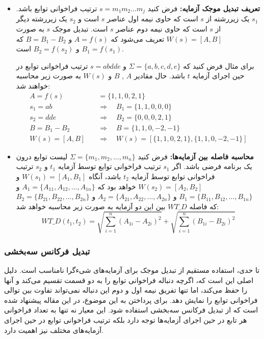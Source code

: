 \begin{itemize}
	\item \textbf{تعریف تبدیل موجک آزمایه:}
فرض کنید \(s = m_1 m_2 \dots m_j\) ترتیب فراخوانی توابع باشد. \(s_1\) یک زیررشته از \(s\) است که حاوی نیمه اول عناصر \(s\) است و \(s_2\) یک زیررشته دیگر از \(s\) است که حاوی نیمه دوم عناصر \(s\) است. تبدیل موجک \(s\) به صورت \(W(s) = [A, B]\) تعریف می‌شود که \(A = f(s)\) و \(B = B_1 - B_2\) که \(B_1 = f(s_1)\) و \(B_2 = f(s_2)\) است.

برای مثال فرض کنید که \(\Sigma = \{a, b, c, d, e\}\) و \(s = abdde\) ترتیب فراخوانی توابع در حین اجرای آزمایه \(t\) باشد. حال مقادیر \(A\) , \(B\) و \(W(s)\) به صورت زیر محاسبه خواهند شد:
\begin{align*}
	A = f(s) &= \{1, 1, 0, 2, 1\} \\
	s_1 = ab \quad & \Rightarrow \quad B_1 = \{1, 1, 0, 0, 0\} \\
	s_2 = dde \quad &\Rightarrow \quad B_2 = \{0, 0, 0, 2, 1\} \\
	B = B_1 - B_2 \quad &\Rightarrow \quad B = \{1, 1, 0, -2, -1\} \\
	W(s) = [A, B] \quad &\Rightarrow \quad W(s) = \left[\{1, 1, 0, 2, 1\}, \{1, 1, 0, -2, -1\}\right]
\end{align*}

\item \textbf{محاسبه فاصله بین آزمایه‌‌ها:}
فرض کنید \(\Sigma = \{m_1, m_2, \dots, m_n\}\) لیست توابع درون یک برنامه فرضی باشد. اگر \(s_1\) ترتیب فراخوانی توابع توسط آزمایه \(t_1\) و \(s_2\) ترتیب فراخوانی توابع توسط آزمایه \(t_2\) باشد، آنگاه \(W(s_1) = [A_1, B_1]\) و \(W(s_2) = [A_2, B_2]\) خواهد بود که \(A_1 = \{A_{11}, A_{12}, \dots, A_{1n}\}\) و \(B_1 = \{B_{11}, B_{12}, \dots, B_{1n}\}\) و \(A_2 = \{A_{21}, A_{22}, \dots, A_{2n}\}\) و \(B_2 = \{B_{21}, B_{22}, \dots, B_{2n}\}\) که فاصله \(WT\_D\) بین این دو آزمایه به صورت زیر محاسبه خواهد شد:
\[
WT\_D(t_1, t_2) = \sqrt{\sum_{i=1}^{n} (A_{1i} - A_{2i})^2} + \sqrt{\sum_{i=1}^{n} (B_{1i} - B_{2i})^2}
\]


\end{itemize}

\subsubsection{تبدیل فرکانس سه‌بخشی}
تا حدی، استفاده مستقیم از تبدیل موجک برای آزمایه‌های شیءگرا نامناسب است. دلیل اصلی این است که، اگرچه دنباله فراخوانی توابع را به دو قسمت تقسیم می‌کند و آنها را حفظ می‌کند، اما تنها تفریق نیمه اول و دوم این دنباله نمی‌تواند تفاوت بین توالی فراخوانی توابع را نمایش دهد. برای پرداختن به این موضوع، در این مقاله پیشنهاد شده است که از تبدیل فرکانس سه‌بخشی  استفاده شود. این معیار نه تنها به تعداد فراخوانی هر تابع در حین اجرای آزمایه‌ها توجه دارد بلکه ترتیب فراخوانی توابع در حین اجرای آزمایه‌های مختلف نیز اهمیت دارد.

